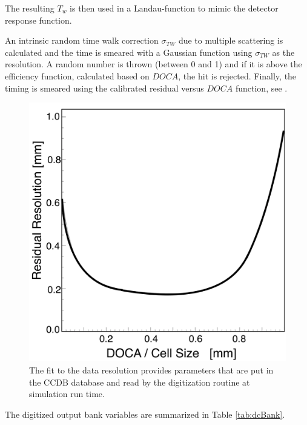 The resulting $T_w$ is then used in a Landau-function to mimic the detector response function.

An intrinsic random time walk correction $\sigma_{TW}$ due to multiple scattering is calculated and the time is smeared with
a Gaussian function using $\sigma_{TW}$ as the resolution.
A random number is thrown (between 0 and 1) and if it is above the efficiency function, calculated based on $DOCA$, the hit is rejected.
Finally, the timing is smeared using the calibrated residual versus $DOCA$ function, see .

\begin{figure}
	\centering
	\includegraphics[width=0.99\columnwidth,keepaspectratio]{img/dcResolution.png}
	\caption{The fit to the data resolution provides parameters that are put in the CCDB database and read by the digitization routine at simulation run time.}
	\label{fig:dcResolution}
\end{figure}

The digitized output bank variables are summarized in Table \ref{tab:dcBank}.

